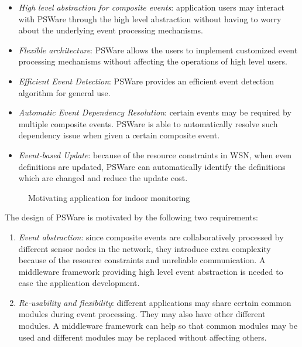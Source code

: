 \begin{itemize}
\item \emph{High level abstraction for composite events}: application users may interact with PSWare through the high level abstraction without having to worry about the underlying event processing mechanisms.
\item \emph{Flexible architecture}: PSWare allows the users to implement customized event processing mechanisms without affecting the operations of high level users.
\item \emph{Efficient Event Detection}: PSWare provides an efficient event detection algorithm for general use.
\item \emph{Automatic Event Dependency Resolution}: certain events may be required by multiple composite events. PSWare is able to automatically resolve such dependency issue when given a certain composite event.
\item \emph{Event-based Update}: because of the resource constraints in WSN, when even definitions are updated, PSWare can automatically identify the definitions which are changed and reduce the update cost.
\end{itemize}

\begin{figure}
\centering
{}
\caption{Motivating application for indoor monitoring}
\label{fig:rooms}
\end{figure}

The design of PSWare is motivated by the following two requirements:

\begin{enumerate}
\item \emph{Event abstraction}: since composite events are collaboratively processed by different sensor nodes in the network, they introduce extra complexity because of the resource constraints and unreliable communication. A middleware framework providing high level event abstraction is needed to ease the application development.
\item \emph{Re-usability and flexibility}: different applications may share certain common modules during event processing. They may also have other different modules. A middleware framework can help so that common modules may be used and different modules may be replaced without affecting others.
\end{enumerate}

